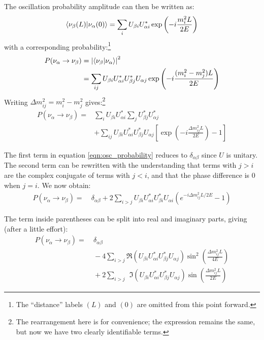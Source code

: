 The oscillation probability amplitude can then be written as:
\begin{equation}\label{eqn:osc_prob_amplitude}
\langle \nu_\beta(L)|\nu_\alpha(0)\rangle = \sum_i U_{\beta i} U_{\alpha i}^* \exp\left(-i \frac{m_i^2 L}{2E}\right)
\end{equation}
with a corresponding probability:\footnote{The ``distance'' labels $(L)$ and $(0)$ are omitted from this point forward.}
\begin{align}\label{eqn:osc_probability}
P(\nu_\alpha \rightarrow \nu_\beta) & = \left|\langle \nu_\beta|\nu_\alpha\rangle\right|^2 \\
 & = \sum_{ij} U_{\beta i} U_{\alpha i}^* U_{\beta j}^* U_{\alpha j} \exp\left(-i\frac{(m_i^2 - m_j^2)L}{2E}\right) \nonumber
\end{align}
Writing $\Delta m_{ij}^2 = m_i^2 - m_j^2$ gives:\footnote{The rearrangement here is for convenience; the expression remains the same, but now we have two clearly identifiable terms.}
\begin{align}
P(\nu_\alpha \rightarrow \nu_\beta) = & \sum_i U_{\beta i} U_{\alpha i}^* \sum_j U_{\beta j}^* U_{\alpha j}^* \nonumber \\
 & + \sum_{ij} U_{\beta i} U_{\alpha i}^* U_{\beta j}^* U_{\alpha j} \left[ \exp\left(-i\frac{\Delta m_{ij}^2 L}{2E}\right) - 1\right]
 \end{align}

The first term in equation \eqref{eqn:osc_probability} reduces to $\delta_{\alpha\beta}$ since $U$ is unitary. The second term can be rewritten with the understanding that terms with $j > i$ are the complex conjugate of terms with $j < i$, and that the phase difference is $0$ when $j = i$. We now obtain:
\begin{align}\label{eqn:osc_probability_again}
P(\nu_\alpha \rightarrow \nu_\beta) = &~ \delta_{\alpha\beta} + 2\sum_{i > j} U_{\beta i} U_{\alpha i}^* U_{\beta i}^* U_{\alpha i}\left(e^{-i\Delta m_{ij}^2 L / 2E} - 1 \right) 
\end{align}

The term inside parentheses can be split into real and imaginary parts, giving (after a little effort):
\begin{align}\label{eqn:osc_prob_threeparts}
P(\nu_\alpha \rightarrow \nu_\beta) = & ~\delta_{\alpha\beta} \nonumber \\
 &~ - 4\sum_{i> j} \Re \left( U_{\beta i} U_{\alpha i}^* U_{\beta j}^* U_{\alpha j} \right) \sin^2\left(\frac{\Delta m_{ij}^2 L}{4E}\right) \nonumber \\
 &~ + 2\sum_{i> j} \phantom{^2} \Im \left( U_{\beta i} U_{\alpha i}^* U_{\beta j}^* U_{\alpha j}\right) \sin \left(\frac{\Delta m_{ij}^2 L}{2E}\right) 
\end{align}

